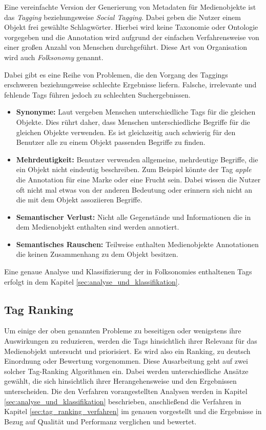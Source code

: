Eine vereinfachte Version der Generierung von Metadaten für Medienobjekte ist das \emph{Tagging} beziehungsweise \emph{Social Tagging}. Dabei geben die Nutzer einem Objekt frei gewählte Schlagwörter. Hierbei wird keine Taxonomie oder Ontologie vorgegeben und die Annotation wird aufgrund der einfachen Verfahrensweise von einer großen Anzahl von Menschen durchgeführt. Diese Art von Organisation wird auch \emph{Folksonomy} genannt.

Dabei gibt es eine Reihe von Problemen, die den Vorgang des Taggings erschweren beziehungsweise schlechte Ergebnisse liefern. Falsche, irrelevante und fehlende Tags führen jedoch zu schlechten Suchergebnissen.

\begin{itemize}
  \item \textbf{Synonyme:} Laut \cite{learningToTag} vergeben Menschen unterschiedliche Tags für die gleichen Objekte. Dies rührt daher, dass Menschen unterschiedliche Begriffe für die gleichen Objekte verwenden. Es ist gleichzeitig auch schwierig für den Benutzer alle zu einem Objekt passenden Begriffe zu finden.
  \item \textbf{Mehrdeutigkeit:} Benutzer verwenden allgemeine, mehrdeutige Begriffe, die ein Objekt nicht eindeutig beschreiben. Zum Beispiel könnte der Tag \emph{apple} die Annotation für eine Marke oder eine Frucht sein. Dabei wissen die Nutzer oft nicht mal etwas von der anderen Bedeutung oder erinnern sich nicht an die mit dem Objekt assoziieren Begriffe.
  \item \textbf{Semantischer Verlust:} Nicht alle Gegenstände und Informationen die in dem Medienobjekt enthalten sind werden annotiert.
  \item \textbf{Semantisches Rauschen:} Teilweise enthalten Medienobjekte Annotationen die keinen Zusammenhang zu dem Objekt besitzen.
\end{itemize}


Eine genaue Analyse und Klassifizierung der in Folksonomies enthaltenen Tags erfolgt in dem Kapitel \ref{sec:analyse_und_klassifikation}.

\subsection{Tag Ranking} %
\label{sub:tag_ranking}

Um einige der oben genannten Probleme zu beseitigen oder wenigstens ihre Auswirkungen zu reduzieren, werden die Tags hinsichtlich ihrer Relevanz für das Medienobjekt untersucht und priorisiert. Es wird also ein Ranking, zu deutsch Einordnung oder Bewertung vorgenommen. Diese Ausarbeitung geht auf zwei solcher Tag-Ranking Algorithmen ein. Dabei werden unterschiedliche Ansätze gewählt, die sich hinsichtlich ihrer Herangehensweise und den Ergebnissen unterscheiden. Die den Verfahren vorangestellten Analysen werden in Kapitel \ref{sec:analyse_und_klassifikation} beschrieben, anschließend die Verfahren in Kapitel \ref{sec:tag_ranking_verfahren} im genauen vorgestellt und die Ergebnisse in Bezug auf Qualität und Performanz verglichen und bewertet.

